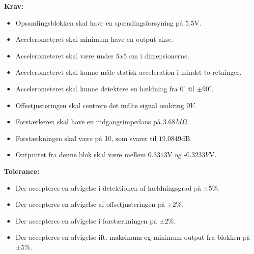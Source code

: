 \noindent\textbf{Krav:}
\begin{itemize}
	\item Opsamlingsblokken skal have en spændingsforsyning på $5.5$V.
	\item Accelerometeret skal minimum have en output akse.%
	\item Accelerometeret skal være under $5x5$ cm i dimensionerne.%
	\item Accelerometeret skal kunne måle statisk acceleration i mindst to retninger.
	\item Accelerometeret skal kunne detektere en hældning fra $0^{\circ}$ til $\pm90^{\circ}$.
	\item Offsetjusteringen skal centrere det målte signal omkring $0V$.
	\item Forstærkeren skal have en indgangsimpedans på $3.68M\Omega$.
	\item Forstærkningen skal være på 10, som svarer til $19.0849$dB.
	\item Outputtet fra denne blok skal være mellem $0.3313$V og -$0.3233V$V.
\end{itemize}
\textbf{Tolerance:}
\begin{itemize}
	\item Der accepteres en afvigelse i detektionen af hældningsgrad på $\pm5\%$.
	\item Der accepteres en afvigelse af offsetjusteringen på $\pm2\%$.
	\item Der accepteres en afvigelse i forstærkningen på $\pm2\%$.
	\item Der accepteres en afvigelse ift. maksimum og minimum output fra blokken på $\pm5\%$.
\end{itemize}
